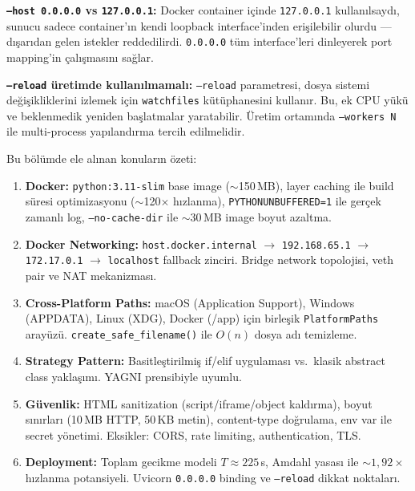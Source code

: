 \textbf{\texttt{--host 0.0.0.0} vs \texttt{127.0.0.1}:} Docker container i\c{c}inde \texttt{127.0.0.1} kullan{\i}lsayd{\i}, sunucu sadece container'{\i}n kendi loopback interface'inden eri\c{s}ilebilir olurdu --- d{\i}\c{s}ar{\i}dan gelen istekler reddedilirdi. \texttt{0.0.0.0} t\"{u}m interface'leri dinleyerek port mapping'in \c{c}al{\i}\c{s}mas{\i}n{\i} sa\u{g}lar.

\textbf{\texttt{--reload} \"{u}retimde kullan{\i}lmamal{\i}:} \texttt{--reload} parametresi, dosya sistemi de\u{g}i\c{s}ikliklerini izlemek i\c{c}in \texttt{watchfiles} k\"{u}t\"{u}phanesini kullan{\i}r. Bu, ek CPU y\"{u}k\"{u} ve beklenmedik yeniden ba\c{s}latmalar yaratabilir. \"{U}retim ortam{\i}nda \texttt{--workers N} ile multi-process yap{\i}land{\i}rma tercih edilmelidir.

\begin{ozet}
Bu b\"{o}l\"{u}mde ele al{\i}nan konular{\i}n \"{o}zeti:

\begin{enumerate}
  \item \textbf{Docker:} \texttt{python:3.11-slim} base image ($\sim$150\,MB), layer caching ile build s\"{u}resi optimizasyonu ($\sim$120$\times$ h{\i}zlanma), \texttt{PYTHONUNBUFFERED=1} ile ger\c{c}ek zamanl{\i} log, \texttt{--no-cache-dir} ile $\sim$30\,MB image boyut azaltma.

  \item \textbf{Docker Networking:} \texttt{host.docker.internal} $\to$ \texttt{192.168.65.1} $\to$ \texttt{172.17.0.1} $\to$ \texttt{localhost} fallback zinciri. Bridge network topolojisi, veth pair ve NAT mekanizmas{\i}.

  \item \textbf{Cross-Platform Paths:} macOS (Application Support), Windows (APPDATA), Linux (XDG), Docker (/app) i\c{c}in birle\c{s}ik \texttt{PlatformPaths} aray\"{u}z\"{u}. \texttt{create\_safe\_filename()} ile $O(n)$ dosya ad{\i} temizleme.

  \item \textbf{Strategy Pattern:} Basitle\c{s}tirilmi\c{s} if/elif uygulamas{\i} vs.\ klasik abstract class yakla\c{s}{\i}m{\i}. YAGNI prensibiyle uyumlu.

  \item \textbf{G\"{u}venlik:} HTML sanitization (script/iframe/object kald{\i}rma), boyut s{\i}n{\i}rlar{\i} (10\,MB HTTP, 50\,KB metin), content-type do\u{g}rulama, env var ile secret y\"{o}netimi. Eksikler: CORS, rate limiting, authentication, TLS.

  \item \textbf{Deployment:} Toplam gecikme modeli $T \approx 225$\,s, Amdahl yasas{\i} ile $\sim$$1{,}92\times$ h{\i}zlanma potansiyeli. Uvicorn \texttt{0.0.0.0} binding ve \texttt{--reload} dikkat noktalar{\i}.
\end{enumerate}
\end{ozet}
